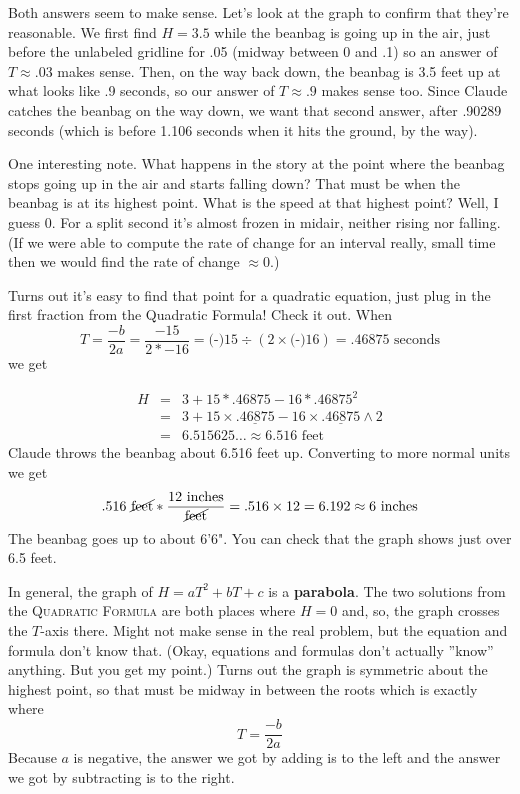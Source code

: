Both answers seem to make sense.  Let's look at the graph to confirm that they're reasonable.  We first find $H=3.5$ while the beanbag is going up in the air, just before the unlabeled gridline for .05 (midway between 0 and .1) so an answer of $T\approx .03$ makes sense.  Then, on the way back down, the beanbag is 3.5 feet up at what looks like .9 seconds, so our answer of $T \approx .9$ makes sense too.   Since Claude catches the beanbag on the way down, we want that second answer, after .90289 seconds (which is before 1.106 seconds when it hits the ground, by the way).

One interesting note.  What happens in the story at the point where the beanbag stops going up in the air and starts falling down?  That must be when the beanbag is at its highest point.  What is the speed at that highest point?  Well, I guess 0.  For a split second it's almost frozen in midair, neither rising nor falling.  (If we were able to compute the rate of change for an interval really, small time then we would find the rate of change $\approx 0$.)

Turns out it's easy to find that point for a quadratic equation, just plug in the first fraction from the Quadratic Formula!  Check it out.  When 
$$T = \frac{-b}{2a} = \frac{-15}{2 \ast -16}=  \text{(-)}15 \div (2 \times  \text{(-)} 16)= .46875 \text{ seconds}$$
we get 
\vspace{-.35in} %

\begin{eqnarray*}
H &= &3 + 15 \ast .46875-16 \ast .46875^2 \\ 
& = & 3 + 15 \times \underline{.46875} - 16 \times \underline{.46875} \wedge 2 \\
& = &  6.515625\ldots \approx 6.516 \text{ feet}
\end{eqnarray*}
\noindent Claude throws the beanbag about 6.516 feet up.  Converting to more normal units we get $$.516 \text{ \cancel{feet}} \ast \frac{12 \text{ inches}}{\text{\cancel{feet}}} = .516 \times 12 = 6.192 \approx 6 \text{ inches}$$  The beanbag goes up to about 6'6".  You can check that the graph shows just over 6.5 feet.  

In general, the graph of $H = aT^2+bT+c$ is a \textbf{parabola}.  The two solutions from the \textsc{Quadratic Formula} are both places where $H=0$ and, so, the graph crosses the $T$-axis there.  Might not make sense in the real problem, but the equation and formula don't know that.  (Okay, equations and formulas don't actually ''know'' anything.  But you get my point.)  Turns out the graph is symmetric about the highest point, so that must be midway in between the roots which is exactly where $$T =\frac{-b}{2a}$$ Because $a$ is negative, the answer we got by adding is to the left and the answer we got by subtracting is to the right.

